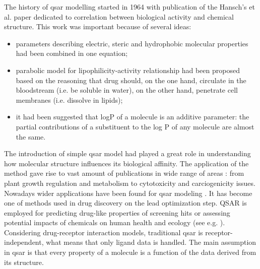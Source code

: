 The history of \acrshort{qsar} modelling started in 1964 with publication of the Hansch's et al. paper {\cite{Hansch1964--Structure}} dedicated to correlation between biological activity and chemical structure.
This work was important because of several ideas:
\begin{itemize}

    \item  parameters describing electric, steric and hydrophobic molecular properties had been combined in one equation;
    \item parabolic model for lipophilicity-activity relationship had been proposed based on the reasoning that drug should, on the one hand, circulate in the bloodstream (i.e. be soluble in water), on the other hand, penetrate cell membranes (i.e. dissolve in lipids); 
    \item it had been suggested that logP of a molecule is an additive parameter: the partial contributions of a substituent to the log P of any molecule are almost the same.
\end{itemize}

The introduction of simple \acrshort{qsar} model had played a great role in understanding how molecular structure influences its biological affinity.
The application of the method gave rise to vast amount of publications in wide range of areas {\cite{Debnath2005QuantitativeMillennium}}: from plant growth regulation and metabolism to cytotoxicity and carciogenicity issues.\\

Nowadays wider applications have been found for \acrshort{qsar} modeling {\cite{Golbraikh2017PredictiveAssessment}}.
It has become one of methods used in drug discovery on the lead optimization step.
QSAR is employed for predicting drug-like properties of screening hits or assessing potential impacts of chemicals on human health and ecology (see e.g. \cite{Demchuk2011SAR/QSARPractice}). \\

Considering drug-receptor interaction models, traditional \acrshort{qsar} is receptor-independent, what means that only ligand data is handled.
The main assumption in \acrshort{qsar} is that every property of a molecule is a function of the data derived from its structure.
\hfill\break\\

